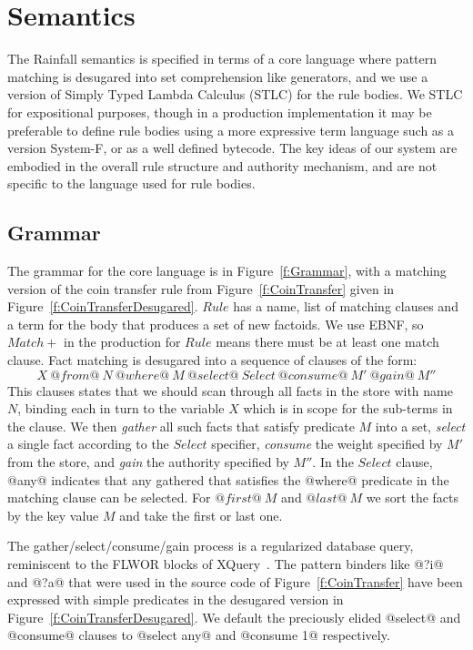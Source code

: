 
\clearpage{}
\section{Semantics}
The Rainfall semantics is specified in terms of a core language where pattern matching is desugared into set comprehension like generators, and we use a version of Simply Typed Lambda Calculus (STLC) for the rule bodies. We STLC for expositional purposes, though in a production implementation it may be preferable to define rule bodies using a more expressive term language such as a version System-F, or as a well defined bytecode. The key ideas of our system are embodied in the overall rule structure and authority mechanism, and are not specific to the language used for rule bodies.

\subsection{Grammar}
The grammar for the core language is in Figure~\ref{f:Grammar}, with a matching version of the coin transfer rule from Figure~\ref{f:CoinTransfer} given in Figure~\ref{f:CoinTransferDesugared}.
$Rule$ has a name, list of matching clauses and a term for the body that produces a set of new factoids. We use EBNF, so $Match+$ in the production for $Rule$ means there must be at least one match clause. Fact matching is desugared into a sequence of clauses of the form:
$$
X~ @from@~ N~ @where@~ M~ @select@~ Select~ @consume@~ M'~ @gain@~ M''
$$
This clauses states that we should scan through all facts in the store with name $N$, binding each in turn to the variable $X$ which is in scope for the sub-terms in the clause. We then \emph{gather} all such facts that satisfy predicate $M$ into a set, \emph{select} a single fact according to the $Select$ specifier, \emph{consume} the weight specified by $M'$ from the store, and \emph{gain} the authority specified by $M''$. In the $Select$ clause, @any@ indicates that any gathered that satisfies the @where@ predicate in the matching clause can be selected. For $@first@~ M$ and $@last@~ M$ we sort the facts by the key value $M$ and take the first or last one.

The gather/select/consume/gain process is a regularized database query, reminiscent to the FLWOR blocks of XQuery~\cite{Boag2002:XQuery}. The pattern binders like @?i@ and @?a@ that were used in the source code of Figure~\ref{f:CoinTransfer} have been expressed with simple predicates in the desugared version in Figure~\ref{f:CoinTransferDesugared}. We default the preciously elided @select@ and @consume@ clauses to @select any@ and @consume 1@ respectively.

